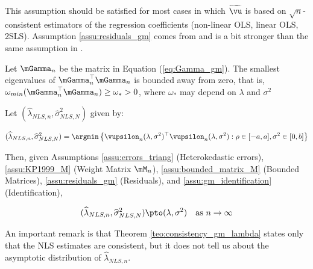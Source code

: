 \documentclass[english,12pt]{book}\usepackage[]{graphicx}\usepackage[]{xcolor}
\begin{document}
This assumption should be satisfied for most cases in which $\widetilde{\vu}$ is based on $\sqrt{n}$-consistent estimators of the regression coefficients (non-linear OLS, linear OLS, 2SLS). Assumption \ref{assu:residuals_gm} comes from \cite{kelejian2010specification} and is a bit stronger than the same assumption in \cite{kelejian1999generalized}.

\begin{assumption}\label{assu:gm_identification} Let $\mGamma_n$ be the matrix in Equation (\ref{eq:Gamma_gm}). The smallest eigenvalues of $\mGamma^\top_n\mGamma_n$ is bounded away from zero, that is, $\omega_{min} (\mGamma^\top_n\mGamma_n) \geq \omega_* > 0$, where $\omega_*$ may depend on $\lambda$ and $\sigma^2$
\end{assumption}

\begin{theorem}[Consistency]\label{teo:consistency_gm_lambda}
Let $(\widehat{\lambda}_{NLS, n}, \widehat{\sigma}^2_{NLS, N})$ given by:

\begin{equation*}
  (\widehat{\lambda}_{NLS, n}, \widehat{\sigma}^2_{NLS, N}) = \argmin \left\lbrace \vupsilon_n(\lambda, \sigma^2)^\top\vupsilon_n(\lambda, \sigma^2): \rho \in [-a, a], \sigma^2\in [0, b]\right\rbrace 
\end{equation*}

Then, given Assumptions \ref{assu:errors_triang} (Heterokedastic errors), \ref{assu:KP1999_M} (Weight Matrix $\mM_n$), \ref{assu:bounded_matrix_M} (Bounded Matrices), \ref{assu:residuals_gm} (Residuals), and \ref{assu:gm_identification} (Identification),

\begin{equation}
(\widehat{\lambda}_{NLS, n}, \widehat{\sigma}^2_{NLS, N})  \pto (\lambda, \sigma^2)\quad \mbox{as $n\to \infty$}
\end{equation}
\end{theorem}

An important remark is that Theorem \ref{teo:consistency_gm_lambda} states only that the NLS estimates are consistent, but it does not tell us about the asymptotic distribution of $\widehat{\lambda}_{NLS, n}$.
\end{document}
